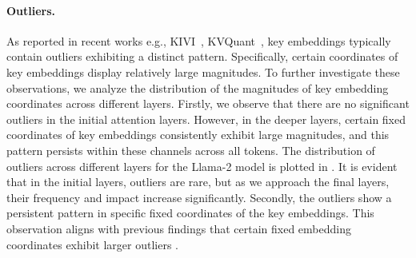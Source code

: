 \documentclass[11pt]{article}
\theoremstyle{plain}
\theoremstyle{definition}
\theoremstyle{remark}
\begin{document}
\paragraph{Outliers.} 
As reported in recent works e.g., KIVI~\cite{liu2024kivi}, KVQuant~\cite{hooper2024kvquant}, key embeddings typically contain outliers exhibiting a distinct pattern. 
Specifically, certain coordinates of key embeddings display relatively large magnitudes. 
To further investigate these observations, we analyze the distribution of the magnitudes of key embedding coordinates across different layers. 
Firstly, we observe that there are no significant outliers in the initial attention layers. 
However, in the deeper layers, certain fixed coordinates of key embeddings consistently exhibit large magnitudes, and this pattern persists within these channels across all tokens.
The distribution of outliers across different layers for the Llama-2 model is plotted in . 
It is evident that in the initial layers, outliers are rare, but as we approach the final layers, their frequency and impact increase significantly.
Secondly, the outliers show a persistent pattern in specific fixed coordinates of the key embeddings. 
This observation aligns with previous findings that certain fixed embedding coordinates exhibit larger outliers \cite{dettmers2022gpt3, lin2023awq, liu2024kivi, hooper2024kvquant}.
\end{document}
